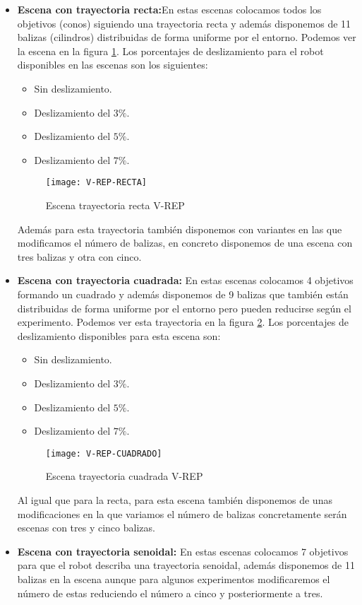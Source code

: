 \begin{itemize}
\item \textbf{Escena con trayectoria recta:}En estas escenas colocamos todos los objetivos (conos) siguiendo una trayectoria recta y además disponemos de 11 balizas (cilindros) distribuidas de forma uniforme por el entorno.
Podemos ver la escena en la figura \ref{Escena-recta}.
Los porcentajes de deslizamiento para el robot disponibles en las escenas son los siguientes:
\begin{itemize}
\item Sin deslizamiento.
\item Deslizamiento del $3\%$.
\item Deslizamiento del $5\%$.
\item Deslizamiento del $7\%$.
\end{itemize}
\begin{figure}[ht!]
\centering
\texttt{[image: V-REP-RECTA]}
\caption{Escena trayectoria recta V-REP} \label{Escena-recta}
\end{figure}
Además para esta trayectoria también disponemos con variantes en las que modificamos el número de balizas, en concreto disponemos de una escena con tres balizas y otra con cinco.
\item \textbf{Escena con trayectoria cuadrada:} En estas escenas colocamos 4 objetivos formando un cuadrado y además disponemos de 9 balizas que también están distribuidas de forma uniforme por el entorno pero pueden reducirse según el experimento.
Podemos ver esta trayectoria en la figura \ref{Escena-cuadrado}.
Los porcentajes de deslizamiento disponibles para esta escena son:
\begin{itemize}
\item Sin deslizamiento.
\item Deslizamiento del $3\%$.
\item Deslizamiento del $5\%$.
\item Deslizamiento del $7\%$.
\end{itemize}
\begin{figure}[ht!]
\centering
\texttt{[image: V-REP-CUADRADO]}
\caption{Escena trayectoria cuadrada V-REP} \label{Escena-cuadrado}
\end{figure}
Al igual que para la recta, para esta escena también disponemos de unas modificaciones en la que variamos el número de balizas concretamente serán escenas con tres y cinco balizas. 
\item \textbf{Escena con trayectoria senoidal:} En estas escenas colocamos 7 objetivos para que el robot describa una trayectoria senoidal, además disponemos de 11 balizas en la escena aunque para algunos experimentos modificaremos el número de estas reduciendo el número a cinco y posteriormente a tres.

\end{itemize}
